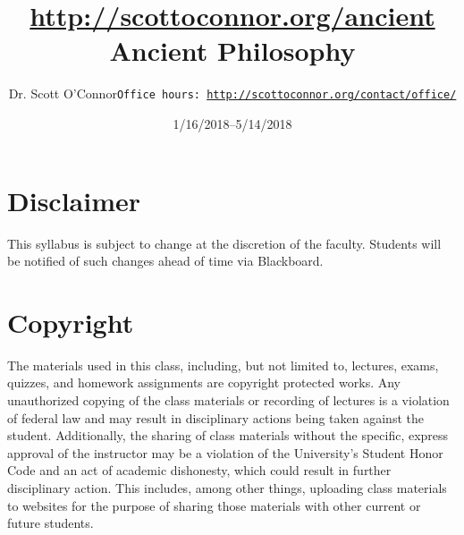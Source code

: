\documentclass[article,oneside]{memoir}
\def\myauthor{Author}
\def\mytitle{Title}
\def\mycopyright{\myauthor}
\def\myweb{\href{http://scottoconnor.org/ancient}{http://scottoconnor.org/ancient}}
\def\myauthor{Dr. Scott O'Connor}
\def\mytitle{{\normalsize \myweb \newline} \HUGE Ancient Philosophy}
\begin{document}
\setsansfont[Mapping=tex-text]{Myriad Pro} 
\setmonofont[Mapping=tex-text,Scale=0.8]{Georgia} 

\def\ind{\hangindent=1 true cm\hangafter=1 \noindent}
\def\labelitemi{$\cdot$}


\title{\LARGE \mytitle}     
\author{\Large\myauthor \newline \footnotesize\texttt{\noindent Office hours: \href{http://scottoconnor.org/contact/office/}{http://scottoconnor.org/contact/office/}}}
\date{1/16/2018--5/14/2018}


\maketitle




%
%


\section{Disclaimer}
 This syllabus is subject to change at the discretion of the faculty. Students will be notified of such changes ahead of time via Blackboard. 

\section{Copyright}
The materials used in this class, including, but not limited to, lectures, exams, quizzes, and homework assignments are copyright protected works.  Any unauthorized copying of the class materials or recording of lectures is a violation of federal law and may result in disciplinary actions being taken against the student.  Additionally, the sharing of class materials without the specific, express approval of the instructor may be a violation of the University's Student Honor Code and an act of academic dishonesty, which could result in further disciplinary action.  This includes, among other things, uploading class materials to websites for the purpose of sharing those materials with other current or future students. 
\end{document}
